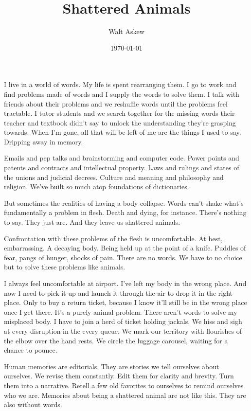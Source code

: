 \documentclass[12pt, oneside]{memoir}
\title{Shattered Animals}
\author{Walt Askew}
\date{\today}
\begin{document}
\maketitle


I live in a world of words. 
My life is spent rearranging them.
I go to work and find problems made of words and I supply the words to
solve them.
I talk with friends about their problems and we reshuffle words until
the problems feel tractable.
I tutor students and we search together for the missing words their
teacher and textbook didn't say to unlock the understanding they're
grasping towards.
When I'm gone, all that will be left of me are the things I used to
say.
Dripping away in memory.

Emails and pep talks and brainstorming and computer code.
Power points and patents and contracts and intellectual property.
Laws and rulings and states of the unions and judicial decrees.
Culture and meaning and philosophy and religion.
We've built so much atop foundations of dictionaries.

But sometimes the realities of having a body collapse. 
Words can’t shake what’s fundamentally a problem in flesh. 
Death and dying, for instance. 
There’s nothing to say.
They just are. 
And they leave us shattered animals. 

Confrontation with these problems of the flesh is uncomfortable.
At best, embarrassing.
A decaying body.
Being held up at the point of a knife.
Puddles of fear, pangs of hunger, shocks of pain.
There are no words.
We have to no choice but to solve these problems like animals.

I always feel uncomfortable at airport.
I've left my body in the wrong place.
And now I need to pick it up and launch it through the air to drop it
in the right place.
Only to buy a return ticket, because I know it'll still be in the
wrong place once I get there.
It's a purely animal problem.
There aren't words to solve my misplaced body.
I have to join a herd of ticket holding jackals.
We hiss and sigh at every disruption in the every queue.
We mark our territory with flourishes of the elbow over the hand
rests.
We circle the luggage carousel, waiting for a chance to pounce.

Human memories are editorials. 
They are stories we tell ourselves about ourselves. 
We revise them constantly. 
Edit them for clarity and brevity. 
Turn them into a narrative. 
Retell a few old favorites to ourselves to remind ourselves who we
are.
Memories about being a shattered animal are not like this. 
They are also without words. 
\end{document}
